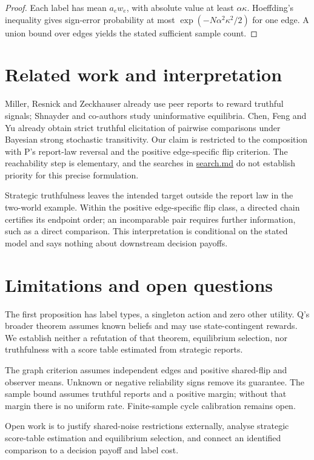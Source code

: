 \documentclass{article}
\begin{document}
\begin{proof}
Each label has mean \(a_ew_e\), with absolute value at least \(\alpha\kappa\). Hoeffding's inequality
gives sign-error probability at most \(\exp(-N\alpha^2\kappa^2/2)\) for one edge. A union bound over
edges yields the stated sufficient sample count. %
\end{proof}

\section{Related work and interpretation}

Miller, Resnick and Zeckhauser \cite{Miller2005} already use peer reports to reward truthful signals;
Shnayder and co-authors \cite{Shnayder2016} study uninformative equilibria. Chen, Feng and Yu
\cite{Chen2024} already obtain strict truthful elicitation of pairwise comparisons under Bayesian strong
stochastic transitivity. Our claim is restricted to the composition with P's report-law reversal and the
positive edge-specific flip criterion. The reachability step is elementary, and the searches in
\url{search.md} do not establish priority for this precise formulation. %

Strategic truthfulness leaves the intended target outside the report law in the two-world example.
Within the positive edge-specific flip class, a directed chain certifies its endpoint order; an
incomparable pair requires further information, such as a direct comparison. This interpretation is
conditional on the stated model and says nothing about downstream decision payoffs.

\section{Limitations and open questions}

The first proposition has label types, a singleton action and zero other utility. Q's broader theorem
assumes known beliefs and may use state-contingent rewards. We establish neither a refutation of that
theorem, equilibrium selection, nor truthfulness with a score table estimated from strategic reports.

The graph criterion assumes independent edges and positive shared-flip and observer means. Unknown or
negative reliability signs remove its guarantee. The sample bound assumes truthful reports and a positive
margin; without that margin there is no uniform rate. Finite-sample cycle calibration remains open.

Open work is to justify shared-noise restrictions externally, analyse strategic score-table estimation
and equilibrium selection, and connect an identified comparison to a decision payoff and label cost.



\end{document}
